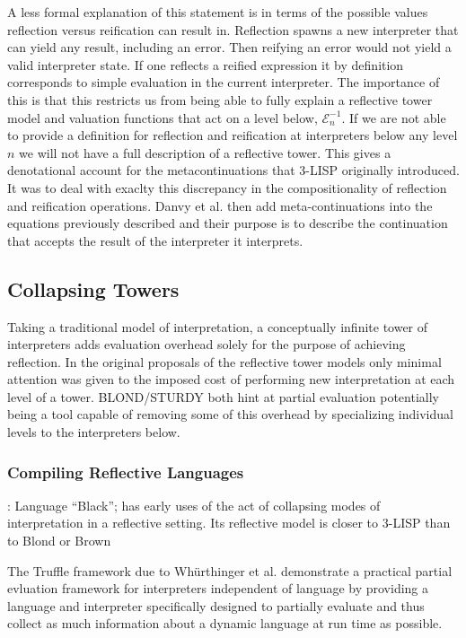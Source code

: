 \documentclass{article}
\theoremstyle{definition}
\begin{document}
A less formal explanation of this statement is in terms of the possible values reflection versus reification can result in. Reflection spawns a new interpreter that can yield any result, including an error. Then reifying an error would not yield a valid interpreter state. If one reflects a reified expression it by definition corresponds to simple evaluation in the current interpreter. The importance of this is that this restricts us from being able to fully explain a reflective tower model and valuation functions that act on a level below, $\mathcal{E}^{-1}_n$. If we are not able to provide a definition for reflection and reification at interpreters below any level $n$ we will not have a full description of a reflective tower. This gives a denotational account for the metacontinuations that 3-LISP originally introduced. It was to deal with exaclty this discrepancy in the compositionality of reflection and reification operations. Danvy et al. then add meta-continuations into the equations previously described and their purpose is to describe the continuation that accepts the result of the interpreter it interprets.

\subsection{Collapsing Towers}
Taking a traditional model of interpretation, a conceptually infinite tower of interpreters adds evaluation overhead solely for the purpose of achieving reflection. In the original proposals of the reflective tower models only minimal attention was given to the imposed cost of performing new interpretation at each level of a tower. BLOND/STURDY both hint at partial evaluation potentially being a tool capable of removing some of this overhead by specializing individual levels to the interpreters below.

\subsubsection{Compiling Reflective Languages}
\cite{asai1996duplication}: Language ``Black''; has early uses of the act of collapsing modes of interpretation in a reflective setting. Its reflective model is closer to 3-LISP than to Blond or Brown
\cite{asai2015compiling}

The Truffle framework due to Wh{\"u}rthinger et al. \cite{wurthinger2017practical} demonstrate a practical partial evluation framework for interpreters independent of language by providing a language and interpreter specifically designed to partially evaluate and thus collect as much information about a dynamic language at run time as possible.
\end{document}
